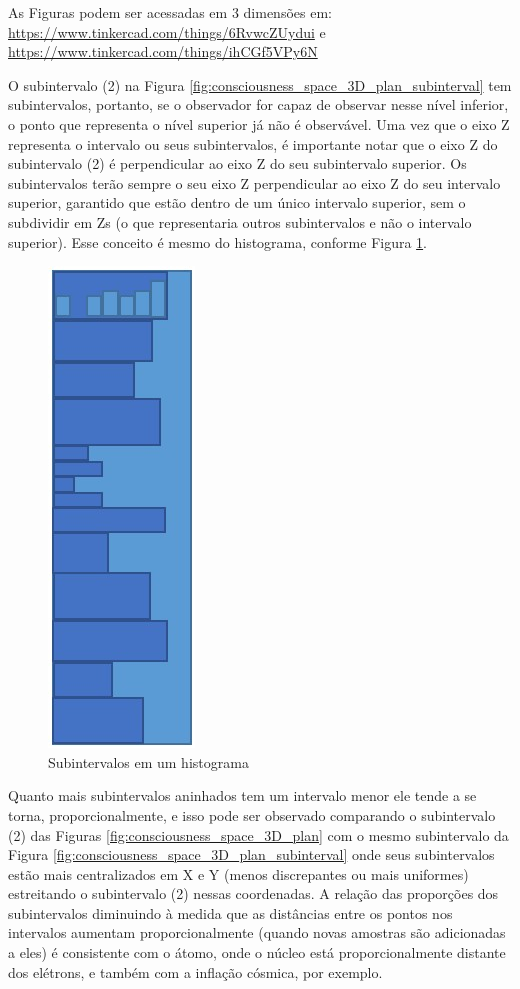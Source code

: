 	\footnotetext
	{As Figuras podem ser acessadas em 3 dimensões em: \url{https://www.tinkercad.com/things/6RvwcZUydui} e \url{https://www.tinkercad.com/things/ihCGf5VPy6N}}

O subintervalo (2) na Figura \ref{fig:consciousness_space_3D_plan_subinterval} tem subintervalos, portanto, se o observador for capaz de observar nesse nível inferior, o ponto que representa o nível superior já não é observável. Uma vez que o eixo Z representa o intervalo ou seus subintervalos, é importante notar que o eixo Z do subintervalo (2) é perpendicular ao eixo Z do seu subintervalo superior. Os subintervalos terão sempre o seu eixo Z perpendicular ao eixo Z do seu intervalo superior, garantido que estão dentro de um único intervalo superior, sem o subdividir em Zs (o que representaria outros subintervalos e não o intervalo superior). Esse conceito é mesmo do histograma, conforme Figura \ref{fig:consciousness_space_3D_plan_histogram}.
	\begin{figure}[H]
	\caption{Subintervalos em um histograma}
	\label{fig:consciousness_space_3D_plan_histogram}
	\centering
	\includegraphics[scale=.6]{sections/images/consciousness_space_3D_plan_histogram.jpg}
	\end{figure}
	
Quanto mais subintervalos aninhados tem um intervalo menor ele tende a se torna, proporcionalmente, e isso pode ser observado comparando o subintervalo (2) das Figuras \ref{fig:consciousness_space_3D_plan} com o mesmo subintervalo da Figura \ref{fig:consciousness_space_3D_plan_subinterval} onde seus subintervalos estão mais centralizados em X e Y (menos discrepantes ou mais uniformes) estreitando o subintervalo (2) nessas coordenadas.  A relação das proporções dos subintervalos diminuindo à medida que as distâncias entre os pontos nos intervalos aumentam proporcionalmente (quando novas amostras são adicionadas a eles) é consistente com o átomo, onde o núcleo está proporcionalmente distante dos elétrons, e também com a inflação cósmica, por exemplo.

